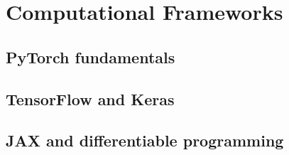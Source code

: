 ﻿\chapter{Computational Frameworks}
\section{PyTorch fundamentals}

\section{TensorFlow and Keras}

\section{JAX and differentiable programming}


